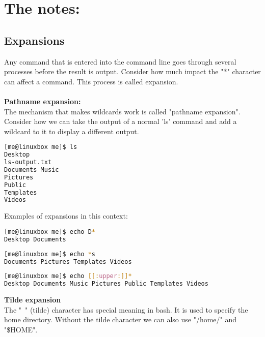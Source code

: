 \documentclass[12pt, letterpaper]{report}
\begin{document}
\section{The notes:}
\subsection{Expansions}
Any command that is entered into the command line goes through several 
processes before the result is output. Consider how much impact the "*" 
character can affect a command. This process is called expansion.\\\\

\textbf{Pathname expansion:}\\
The mechanism that makes wildcards work is called "pathname expansion". Consider 
how we can take the output of a normal 'ls' command and add a wildcard to it to 
display a different output.
\begin{lstlisting}[language=Bash,framexleftmargin=5mm,frame=single,xleftmargin=18pt]
[me@linuxbox me]$ ls
Desktop
ls-output.txt
Documents Music
Pictures
Public
Templates
Videos
\end{lstlisting}
Examples of expansions in this context:
\begin{lstlisting}[language=Bash,framexleftmargin=5mm,frame=single,xleftmargin=18pt]
[me@linuxbox me]$ echo D*
Desktop Documents
\end{lstlisting}

\begin{lstlisting}[language=Bash,framexleftmargin=5mm,frame=single,xleftmargin=18pt]
[me@linuxbox me]$ echo *s
Documents Pictures Templates Videos
\end{lstlisting}

\begin{lstlisting}[language=Bash,framexleftmargin=5mm,frame=single,xleftmargin=18pt]
[me@linuxbox me]$ echo [[:upper:]]*
Desktop Documents Music Pictures Public Templates Videos
\end{lstlisting}

\vspace{2.5mm}

\textbf{Tilde expansion}\\
The "~" (tilde) character has special meaning in bash. It is used to specify 
the home directory. Without the tilde character we can also use "/home/" and 
"\$HOME".

\vspace{2.5mm}
\end{document}
